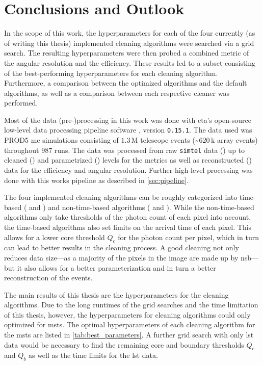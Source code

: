 \chapter{Conclusions and Outlook}
\label{ch:conclusions}
\vspace{-0.5cm}
In the scope of this work, the hyperparameters for each of the four currently (as of writing this thesis)
implemented cleaning algorithms were searched via a grid search. The resulting hyperparameters were then
probed \wrt a combined metric of the angular resolution and the efficiency. These results led to a subset
consisting of the best-performing hyperparameters for each cleaning algorithm. Furthermore, a comparison between the
optimized algorithms and the default algorithms, as well as a comparison between each respective
cleaner was performed.

Most of the data (pre-)processing in this work was done with \gls{cta}'s open-source low-level data processing pipeline
software \ctapipe{}, version \texttt{0.15.1}. The data used was PROD5 \gls{mc} simulations consisting of
\(\num{1.3}\)\,M telescope events (\sim\(\num{620}\)\,k array events) throughout \(987\) runs. The data
was processed from raw \texttt{simtel} data (\rzero) up to cleaned (\dloa) and parametrized (\dlob) levels
for the metrics as well as reconstructed (\dlt) data for the efficiency and angular resolution.
Further high-level processing was done with this works pipeline as described in \autoref{sec:pipeline}.

The four implemented cleaning algorithms can be roughly categorized into time-based (\fact{} and \tcc) and non-time-based
algorithms (\tailcuts{} and \mars{}). While the non-time-based algorithms only take thresholds of the photon count of each pixel
into account, the time-based algorithms also set limits on the arrival time of each pixel. This allows
for a lower core threshold \(Q_c\) for the photon count per pixel, which in turn can lead to better
results in the cleaning process. A good cleaning not only reduces data size---as a majority of the
pixels in the image are made up by \gls{nsb}---but it also allows for a better parameterization and in turn
a better reconstruction of the events.

The main results of this thesis are the hyperparameters for the cleaning algorithms.
Due to the long runtimes of the grid searches and the time limitation of this thesis, however, the hyperparameters
for cleaning algorithms could only optimized for \glspl{mst}. The optimal hyperparameters of each cleaning algorithm for
the \glspl{mst} are listed in \autoref{tab:best_parameters}. A further grid search with only \gls{lst}
data would be necessary to find the remaining core and boundary thresholds \(Q_c\) and \(Q_b\) as well
as the time limits for the \gls{lst} data.

